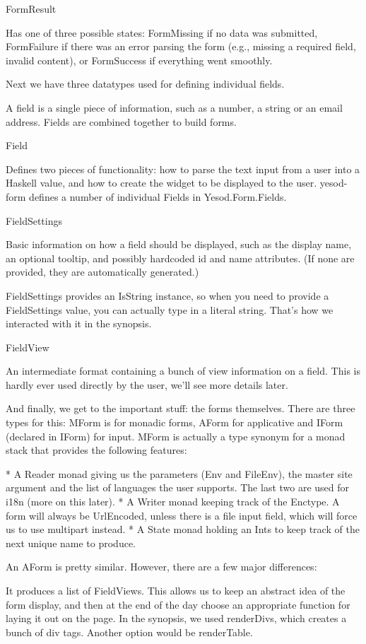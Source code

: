 FormResult

Has one of three possible states: FormMissing if no data was submitted, FormFailure if there was an error parsing the form (e.g., missing a required field, invalid content), or FormSuccess if everything went smoothly.

Next we have three datatypes used for defining individual fields.

A field is a single piece of information, such as a number, a string or an email address. Fields are combined together to build forms.

Field

Defines two pieces of functionality: how to parse the text input from a user into a Haskell value, and how to create the widget to be displayed to the user. yesod-form defines a number of individual Fields in Yesod.Form.Fields.

FieldSettings

Basic information on how a field should be displayed, such as the display name, an optional tooltip, and possibly hardcoded id and name attributes. (If none are provided, they are automatically generated.)

FieldSettings provides an IsString instance, so when you need to provide a FieldSettings value, you can actually type in a literal string. That's how we interacted with it in the synopsis.

FieldView

An intermediate format containing a bunch of view information on a field. This is hardly ever used directly by the user, we'll see more details later.

And finally, we get to the important stuff: the forms themselves. There are three types for this: MForm is for monadic forms, AForm for applicative and IForm (declared in IForm) for input. MForm is actually a type synonym for a monad stack that provides the following features:

* A Reader monad giving us the parameters (Env and FileEnv), the master site argument and the list of languages the user supports. The last two are used for i18n (more on this later).
* A Writer monad keeping track of the Enctype. A form will always be UrlEncoded, unless there is a file input field, which will force us to use multipart instead.
* A State monad holding an Ints to keep track of the next unique name to produce.

An AForm is pretty similar. However, there are a few major differences:

It produces a list of FieldViews. This allows us to keep an abstract idea of the form display, and then at the end of the day choose an appropriate function for laying it out on the page. In the synopsis, we used renderDivs, which creates a bunch of div tags. Another option would be renderTable.

